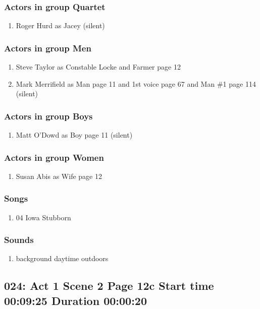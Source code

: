 \subsubsection{Actors in group Quartet}
\begin{enumerate}
\item Roger Hurd as Jacey (silent)
\end{enumerate}
\subsubsection{Actors in group Men}
\begin{enumerate}
\item Steve Taylor as Constable Locke and Farmer page 12
\item Mark Merrifield as Man page 11 and 1st voice page 67 and Man \#1 page 114 (silent)
\end{enumerate}
\subsubsection{Actors in group Boys}
\begin{enumerate}
\item Matt O'Dowd as Boy page 11 (silent)
\end{enumerate}
\subsubsection{Actors in group Women}
\begin{enumerate}
\item Susan Abis as Wife page 12
\end{enumerate}

\subsubsection{Songs}
\begin{enumerate}
\item 04 Iowa Stubborn
\end{enumerate}\subsubsection{Sounds}
\begin{enumerate}
\item background daytime outdoors
\end{enumerate}
\subsection{024: Act 1 Scene 2 Page 12c Start time 00:09:25 Duration 00:00:20}

